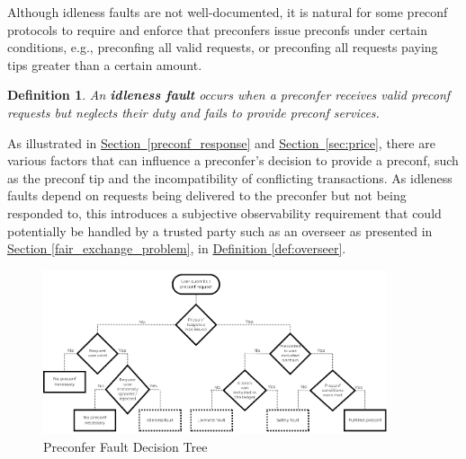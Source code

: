 \documentclass[a4paper]{article}
\theoremstyle{boldstyle}
\newtheorem{definitionx}{Definition}
\newenvironment{definition}
  {\begin{defopenboxq}\begin{definitionx}}
  {\end{definitionx}\end{defopenboxq}}
\newcommand{\cm}[1]{\textcolor{blue}{\textbf{Conor:} #1}}
\newcommand{\dk}[1]{\textcolor{cyan}{\textbf{Demetris:} #1}}
\begin{document}
     Although idleness faults are not well-documented, it is natural for some preconf protocols to require and enforce that preconfers issue preconfs under certain conditions, e.g., preconfing all valid requests, or preconfing all requests paying tips greater than a certain amount.
        \begin{definition}
            An \textbf{idleness fault} occurs when a preconfer receives valid preconf requests but neglects their duty and fails to provide preconf services.
        \end{definition}
      
            
        As illustrated in \hyperref[preconf_response]{Section~\ref{preconf_response}} and \hyperref[sec:price]{Section~\ref{sec:price}}, there are various factors that can influence a preconfer's decision to provide a preconf, such as the preconf tip and the incompatibility of conflicting transactions. As idleness faults depend on requests being delivered to the preconfer but not being responded to, this introduces a subjective observability requirement that could potentially be handled by a trusted party such as an overseer as presented in \hyperref[fair_exchange_problem]{Section \ref{fair_exchange_problem}}, in \hyperref[def:overseer]{Definition \ref{def:overseer}}.
        

    \begin{figure}[htbp]
        \centering
        \includegraphics[width=0.9\textwidth]{figures/preconferFaultDecisionTree.png}
        \caption{Preconfer Fault Decision Tree}
        \label{preconfer fault tree}
    \end{figure}
    
\end{document}
